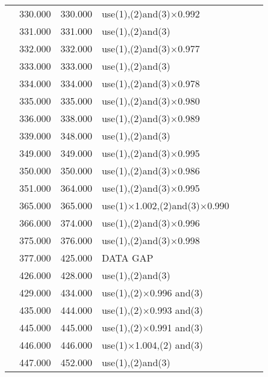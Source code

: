 \begin{table}[!h]
\begin{tabular}{ | c | c | c | p{5.5cm} | c | c | c |}
    &   330.000 &   330.000 &   use(1),(2)and(3)$\times$0.992  &       &       &       \\
    &   331.000 &   331.000 &   use(1),(2)and(3) &       &       &       \\
    &   332.000 &   332.000 &   use(1),(2)and(3)$\times$0.977  &       &       &       \\
    &   333.000 &   333.000 &   use(1),(2)and(3) &       &       &       \\
    &   334.000 &   334.000 &   use(1),(2)and(3)$\times$0.978  &       &       &       \\
    &   335.000 &   335.000 &   use(1),(2)and(3)$\times$0.980  &       &       &       \\
    &   336.000 &   338.000 &   use(1),(2)and(3)$\times$0.989  &       &       &       \\
    &   339.000 &   348.000 &   use(1),(2)and(3) &       &       &       \\
    &   349.000 &   349.000 &   use(1),(2)and(3)$\times$0.995  &       &       &       \\
    &   350.000 &   350.000 &   use(1),(2)and(3)$\times$0.986  &       &       &       \\
    &   351.000 &   364.000 &   use(1),(2)and(3)$\times$0.995  &       &       &       \\
    &   365.000 &   365.000 &   use(1)$\times$1.002,(2)and(3)$\times$0.990    &       &       &       \\
    &   366.000 &   374.000 &   use(1),(2)and(3)$\times$0.996  &       &       &       \\
    &   375.000 &   376.000 &   use(1),(2)and(3)$\times$0.998  &       &       &       \\
    &   377.000 &   425.000 &   DATA GAP    &       &       &       \\
    &   426.000 &   428.000 &   use(1),(2)and(3) &       &       &       \\
    &   429.000 &   434.000 &   use(1),(2)$\times$0.996 and(3)  &       &       &       \\
    &   435.000 &   444.000 &   use(1),(2)$\times$0.993 and(3)  &       &       &       \\
    &   445.000 &   445.000 &   use(1),(2)$\times$0.991 and(3)  &       &       &       \\
    &   446.000 &   446.000 &   use(1)$\times$1.004,(2) and(3)  &       &       &       \\
    &   447.000 &   452.000 &   use(1),(2)and(3) &       &       &       \\

\end{tabular}
\end{table}
